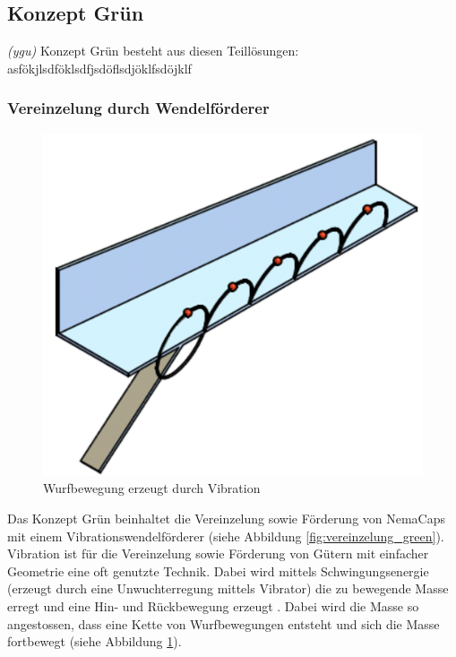 \newpage
\subsection{Konzept Grün}
\label{KonzeptGreen}
\textit{(ygu)} Konzept Grün besteht aus diesen Teillösungen: asfökjlsdföklsdfjsdöflsdjöklfsdöjklf
\newline

\subsubsection{Vereinzelung durch Wendelförderer}
\begin{figure}
	\includegraphics[scale=0.2]{Illustrationen/5-Konzept/foerderbewegung.png}
	\caption{Wurfbewegung erzeugt durch Vibration \protect\cite{webac}}
	\label{fig:foerderbewegung}
\end{figure}
Das Konzept Grün beinhaltet die Vereinzelung sowie Förderung von NemaCaps mit einem Vibrationswendelförderer (siehe Abbildung \ref{fig:vereinzelung_green}). Vibration ist für die Vereinzelung sowie Förderung von Gütern mit einfacher Geometrie eine oft genutzte Technik. Dabei wird mittels Schwingungsenergie (erzeugt durch eine Unwuchterregung mittels Vibrator) die zu bewegende Masse erregt und eine Hin- und Rückbewegung erzeugt \cite{risch}. Dabei wird die Masse so angestossen, dass eine Kette von Wurfbewegungen entsteht und sich die Masse fortbewegt (siehe Abbildung \ref{fig:foerderbewegung}).

